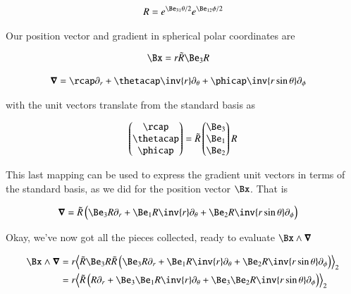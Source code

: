 \begin{align}\label{eqn:qmAngularMom:goo1}
R = e^{\Be_{31}\theta/2} e^{\Be_{12}\phi/2}
\end{align}

Our position vector and gradient in spherical polar coordinates are

\begin{align}\label{eqn:qmAngularMom:goo2}
\Bx &= r \tilde{R} \Be_3 R 
\end{align}

\begin{align}\label{eqn:qmAngularMom:goo3}
\spacegrad &= \rcap \partial_r + \thetacap \inv{r} \partial_\theta + \phicap \inv{r \sin\theta} \partial_\phi
\end{align}

with the unit vectors translate from the standard basis as

\begin{align}\label{eqn:qmAngularMom:goo4}
\begin{pmatrix}
\rcap \\
\thetacap \\
\phicap \\
\end{pmatrix}
=
\tilde{R}
\begin{pmatrix}
\Be_3 \\
\Be_1 \\
\Be_2 \\
\end{pmatrix}
R
\end{align}

This last mapping can be used to express the gradient unit vectors in terms of the standard basis, as we did for the position vector $\Bx$.  That is

\begin{align}\label{eqn:qmAngularMom:goo5}
\spacegrad &= \tilde{R} \left( \Be_3 R \partial_r + \Be_1 R \inv{r} \partial_\theta + \Be_2 R \inv{r \sin\theta} \partial_\phi \right)
\end{align}

Okay, we've now got all the pieces collected, ready to evaluate $\Bx \wedge \spacegrad$

\begin{align*}
\Bx \wedge \spacegrad 
&=
r \gpgradetwo{\tilde{R} \Be_3 R 
\tilde{R} \left( \Be_3 R \partial_r + \Be_1 R \inv{r} \partial_\theta + \Be_2 R \inv{r \sin\theta} \partial_\phi \right) } \\
&=
r \gpgradetwo{\tilde{R} \left( R \partial_r + \Be_3 \Be_1 R \inv{r} \partial_\theta + \Be_3 \Be_2 R \inv{r \sin\theta} \partial_\phi \right) } \\
\end{align*}


